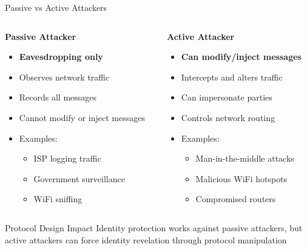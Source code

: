\documentclass[aspectratio=169, lualatex, handout]{beamer}
\begin{document}
\begin{frame}{Passive vs Active Attackers}
	\begin{columns}
		\begin{column}{0.5\textwidth}
			\textbf{Passive Attacker}
			\begin{itemize}
				\item \textbf{Eavesdropping only}
				\item Observes network traffic
				\item Records all messages
				\item Cannot modify or inject messages
				\item Examples:
				      \begin{itemize}
					      \item ISP logging traffic
					      \item Government surveillance
					      \item WiFi sniffing
				      \end{itemize}
			\end{itemize}
		\end{column}
		\begin{column}{0.5\textwidth}
			\textbf{Active Attacker}
			\begin{itemize}
				\item \textbf{Can modify/inject messages}
				\item Intercepts and alters traffic
				\item Can impersonate parties
				\item Controls network routing
				\item Examples:
				      \begin{itemize}
					      \item Man-in-the-middle attacks
					      \item Malicious WiFi hotspots
					      \item Compromised routers
				      \end{itemize}
			\end{itemize}
		\end{column}
	\end{columns}
	\begin{alertblock}{Protocol Design Impact}
		Identity protection works against passive attackers, but active attackers can force identity revelation through protocol manipulation
	\end{alertblock}
\end{frame}
\end{document}
